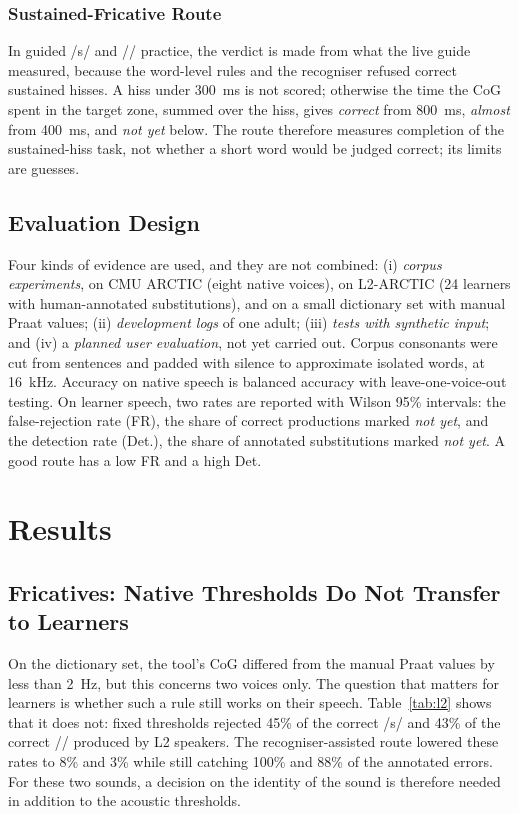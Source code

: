 \documentclass[engproc,article,submit,moreauthors]{Definitions/mdpi}
\newcommand{\ipa}[1]{/#1/}
\begin{document}
\subsubsection{Sustained-Fricative Route}
In guided \ipa{s} and \ipa{\textesh} practice, the verdict is made from what the live guide measured, because the word-level rules and the recogniser refused correct sustained hisses. A hiss under 300~ms is not scored; otherwise the time the CoG spent in the target zone, summed over the hiss, gives \textit{correct} from 800~ms, \textit{almost} from 400~ms, and \textit{not yet} below. The route therefore measures completion of the sustained-hiss task, not whether a short word would be judged correct; its limits are guesses.

\subsection{Evaluation Design}
Four kinds of evidence are used, and they are not combined: (i) \emph{corpus experiments}, on CMU ARCTIC \cite{kominek2004} (eight native voices), on L2-ARCTIC \cite{zhao2018} (24 learners with human-annotated substitutions), and on a small dictionary set with manual Praat values; (ii) \emph{development logs} of one adult; (iii) \emph{tests with synthetic input}; and (iv) a \emph{planned user evaluation}, not yet carried out. Corpus consonants were cut from sentences and padded with silence to approximate isolated words, at 16~kHz. Accuracy on native speech is balanced accuracy with leave-one-voice-out testing. On learner speech, two rates are reported with Wilson 95\% intervals: the false-rejection rate (FR), the share of correct productions marked \textit{not yet}, and the detection rate (Det.), the share of annotated substitutions marked \textit{not yet}. A good route has a low FR and a high Det.

\section{Results}\label{sec:results}
\subsection{Fricatives: Native Thresholds Do Not Transfer to Learners}
On the dictionary set, the tool's CoG differed from the manual Praat values by less than 2~Hz, but this concerns two voices only. The question that matters for learners is whether such a rule still works on their speech. Table~\ref{tab:l2} shows that it does not: fixed thresholds rejected 45\% of the correct \ipa{s} and 43\% of the correct \ipa{\textesh} produced by L2 speakers. The recogniser-assisted route lowered these rates to 8\% and 3\% while still catching 100\% and 88\% of the annotated errors. For these two sounds, a decision on the identity of the sound is therefore needed in addition to the acoustic thresholds.
\end{document}
